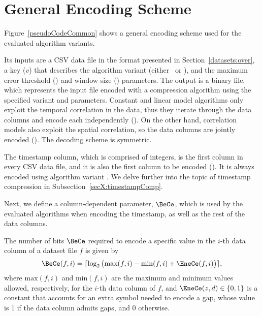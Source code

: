 

\vspace{-23pt}
\section{General Encoding Scheme}
\label{algo:details}


\vspace{-3pt}
Figure~\ref{pseudoCodeCommon} shows a general encoding scheme used for the evaluated algorithm variants. 





\clearpage


Its inputs are a CSV data file in the format presented in Section~\ref{datasets:over}, a key ($v$) that describes the algorithm variant (either \maskalgo\ or \NOmaskalgo), and the maximum error threshold (\maxerror) and window size (\win) parameters. The output is a binary file, which represents the input file encoded with a compression algorithm using the specified variant and parameters. Constant and linear model algorithms only exploit the temporal correlation in the data, thus they iterate through the data columns and encode each independently (). On the other hand, correlation models also exploit the spatial correlation, so the data columns are jointly encoded (). The decoding scheme is symmetric.


The timestamp column, which is comprised of integers, is the first column in every CSV data file, and it is also the first column to be encoded (). It is always encoded using algorithm variant . We delve further into the topic of timestamp compression in Subsection~\ref{secX:timestampComp}. 


Next, we define a column-dependent parameter, $\BeCe$, which is used by the evaluated algorithms when encoding the timestamp, as well as the rest of the data columns.


\begin{defcion}
The number of bits $\BeCe$ required to encode a specific value in the $i$-th data column of a dataset file $f$ is given by
\vspace{-5pt}
\begin{equation}
\label{eq:bece}
\BeCe(f, i) = \lceil{ \log_2 \big( \text{max}(f, i) - \text{min}(f, i) + \EneCe(f, i) \big) } \rceil,
\end{equation}
where $\text{max}(f, i)$ and $\text{min}(f, i)$ are the maximum and minimum values allowed, respectively, for the $i$-th data column of $f$, and $\EneCe(z, d)\in \{0,1\}$ is a constant that accounts for an extra symbol needed to encode a gap, whose value is 1 if the data column admits gaps, and 0 otherwise.
\end{defcion}


